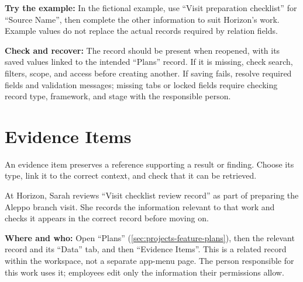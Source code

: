 \textbf{Try the example:} In the fictional example, use “Visit preparation checklist” for “Source Name”, then complete the other information to suit Horizon's work. Example values do not replace the actual records required by relation fields.

\textbf{Check and recover:} The record should be present when reopened, with its saved values linked to the intended “Plans” record. If it is missing, check search, filters, scope, and access before creating another. If saving fails, resolve required fields and validation messages; missing tabs or locked fields require checking record type, framework, and stage with the responsible person.

\clearpage
\section{Evidence Items}
\label{sec:projects-feature-planning-evidence-items}

An evidence item preserves a reference supporting a result or finding. Choose its type, link it to the correct context, and check that it can be retrieved.

\begin{rcnote}
At Horizon, Sarah reviews “Visit checklist review record” as part of preparing the Aleppo branch visit. She records the information relevant to that work and checks it appears in the correct record before moving on.
\end{rcnote}

\textbf{Where and who:} Open “Plans” (\ref{sec:projects-feature-plans}), then the relevant record and its “Data” tab, and then “Evidence Items”. This is a related record within the workspace, not a separate app-menu page. The person responsible for this work uses it; employees edit only the information their permissions allow.

